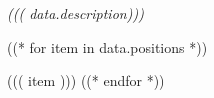 \textit{((( data.description)))}
\begin{tightemize}
((* for item in data.positions *))
\item ((( item )))
((* endfor *))
\end{tightemize}
